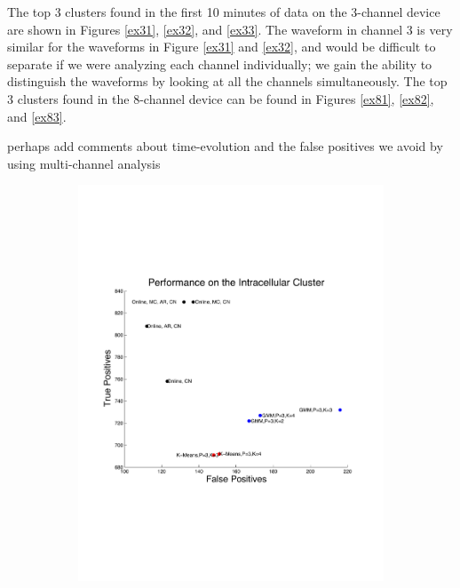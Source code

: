  The top 3 clusters found in the first 10 minutes of data on the 3-channel device are shown in Figures \ref{ex31}, \ref{ex32}, and \ref{ex33}.  The waveform in channel 3 is very similar for the waveforms in Figure \ref{ex31} and \ref{ex32}, and would be difficult to separate if we were analyzing each channel individually; we gain the ability to distinguish the waveforms by looking at all the channels simultaneously.  The top 3 clusters found in the 8-channel device can be found in Figures \ref{ex81}, \ref{ex82}, and \ref{ex83}.

{\color{red} perhaps add comments about time-evolution and the false positives we avoid by using multi-channel analysis}



\begin{center}
\begin{figure}
\begin{subfigure}[b]{.5\textwidth}
\centering
\includegraphics[width=\textwidth]{../figs/truefalsepositive}
\caption{}
\label{hc1res}

\end{subfigure}
\end{figure}
\end{center}
